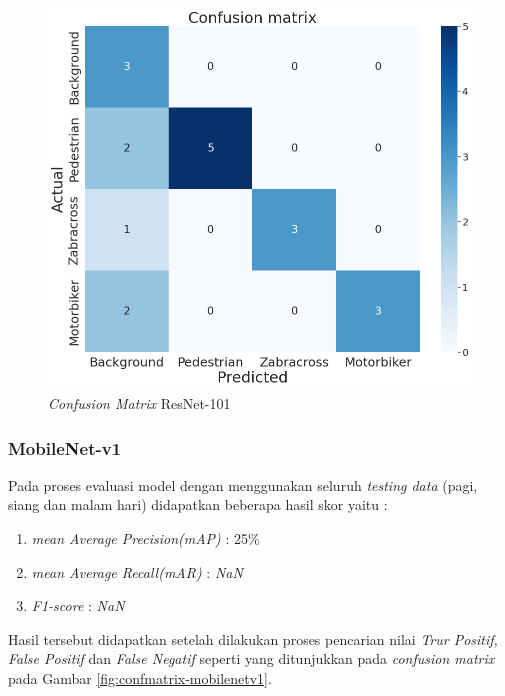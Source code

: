 \begin{figure}[H]
	\centering
	\includegraphics[scale=0.3]{gambar/confmatrix/all-resnet101-blue.png}
	\caption{\textit{Confusion Matrix} ResNet-101}
	\label{fig:confmatrix-resnet101}
\end{figure}

\subsubsection{MobileNet-v1}

Pada proses evaluasi model dengan menggunakan seluruh \textit{testing data} (pagi, siang dan malam hari) didapatkan beberapa hasil skor yaitu :
\begin{enumerate}[nolistsep]
	\item \textit{mean Average Precision(mAP)} : 25\%
	\item \textit{mean Average Recall(mAR)} : \textit{NaN}
	\item \textit{F1-score} : \textit{NaN}
\end{enumerate}
Hasil tersebut didapatkan setelah dilakukan proses pencarian nilai \textit{Trur Positif, False Positif} dan \textit{False Negatif} seperti yang ditunjukkan pada \textit{confusion matrix} pada Gambar \ref{fig:confmatrix-mobilenetv1}.

